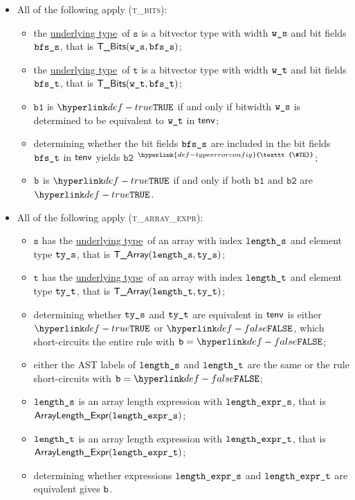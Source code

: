 \documentclass{book}
\newcommand\TypeErrorConfig[0]{\hyperlink{def-typeerrorconfig}{\texttt{\#TE}}}
\newcommand\ProseOrTypeError[0]{\hyperlink{def-proseortypeerror}{$^{\TypeErrorConfig}$}}
\newcommand\underlyingtype[0]{\hyperlink{def-underlyingtype}{underlying type}}
\newcommand\vt[0]{\texttt{t}}
\newcommand\vs[0]{\texttt{s}}
\newcommand\vbone[0]{\texttt{b1}}
\newcommand\vbtwo[0]{\texttt{b2}}
\begin{document}
\begin{itemize}
\item All of the following apply (\textsc{t\_bits}):
  \begin{itemize}
  \item the \underlyingtype\ of $\vs$ is a bitvector type with width $\texttt{w\_s}$ and bit fields $\texttt{bfs\_s}$, that is $\textsf{T\_Bits}(\texttt{w\_s}, \texttt{bfs\_s})$;
  \item the \underlyingtype\ of $\vt$ is a bitvector type with width $\texttt{w\_t}$ and bit fields $\texttt{bfs\_t}$, that is $\textsf{T\_Bits}(\texttt{w\_t}, \texttt{bfs\_t})$;
  \item $\vbone$ is $\True$ if and only if bitwidth $\texttt{w\_s}$ is determined to be equivalent to $\texttt{w\_t}$ in $\textsf{tenv}$;
  \item determining whether the bit fields $\texttt{bfs\_s}$ are included in the bit fields $\texttt{bfs\_t}$ in $\textsf{tenv}$ yields $\vbtwo$ \ProseOrTypeError;
  \item $\texttt{b}$ is $\True$ if and only if both $\vbone$ and $\vbtwo$ are $\True$.
  \end{itemize}

\item All of the following apply (\textsc{t\_array\_expr}):
  \begin{itemize}
  \item $\vs$ has the \underlyingtype\ of an array with index $\texttt{length\_s}$ and element type $\texttt{ty\_s}$, that is $\textsf{T\_Array}(\texttt{length\_s}, \texttt{ty\_s})$;
  \item $\vt$ has the \underlyingtype\ of an array with index $\texttt{length\_t}$ and element type $\texttt{ty\_t}$, that is $\textsf{T\_Array}(\texttt{length\_t}, \texttt{ty\_t})$;
  \item determining whether $\texttt{ty\_s}$ and $\texttt{ty\_t}$ are equivalent in $\textsf{tenv}$ is either $\True$
  or $\False$, which short-circuits the entire rule with $\vb=\False$;
  \item either the AST labels of $\texttt{length\_s}$ and $\texttt{length\_t}$ are the same or the rule short-circuits with $\vb=\False$;
  \item $\texttt{length\_s}$ is an array length expression with $\texttt{length\_expr\_s}$, that is \\ $\textsf{ArrayLength\_Expr}(\texttt{length\_expr\_s})$;
  \item $\texttt{length\_t}$ is an array length expression with $\texttt{length\_expr\_t}$, that is \\ $\textsf{ArrayLength\_Expr}(\texttt{length\_expr\_t})$;
  \item determining whether expressions $\texttt{length\_expr\_s}$ and $\texttt{length\_expr\_t}$ are equivalent gives $\texttt{b}$.
  \end{itemize}


\end{itemize}
\end{document}
